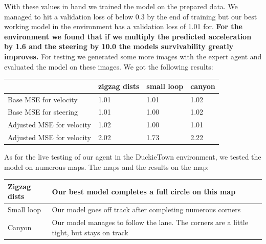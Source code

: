 \documentclass{article}
\begin{document}
With these values in hand we trained the model on the prepared data. We managed to hit a
validation loss of below 0.3 by the end of training but our best working model in the environment has a validation loss of 1.01 for.
\textbf{For the environment we found that if we multiply the predicted acceleration by 1.6 and the steering by 10.0
the models survivability greatly improves.}
For testing we generated some more images with the expert agent and evaluated the model on these
images. We got the following results:
\begin{center}
\begin{tabular}{ | m{15em} | m{5em}| m{5em} | m{5em}|}
  \hline
   & zigzag dists & small loop & canyon\\
  \hline
  \hline
   Base MSE for velocity & 1.01 & 1.01 & 1.02\\
  \hline
  \hline
   Base MSE for steering & 1.01 & 1.00 & 1.02\\
  \hline
    \hline
   Adjusted MSE for velocity & 1.02 & 1.00 & 1.01\\
  \hline
    \hline
   Adjusted MSE for velocity & 2.02 & 1.73 & 2.22\\
  \hline
\end{tabular}
\end{center}
\vspace*{\baselineskip}
As for the live testing of our agent in the DuckieTown environment, we tested the model on
numerous maps. The maps and the results on the map:

\begin{center}
\begin{tabular}{ | m{5em} | m{20em}| }
  \hline
    Zigzag dists & Our best model completes a full circle on this map \\
  \hline
    Small loop & Our model goes off track after completing numerous corners \\
      \hline
    Canyon  & Our model manages to follow the lane. The corners are a little tight, but stays on track
 \\
    \hline
\end{tabular}
\end{center}

\vspace*{2\baselineskip}

\end{document}
